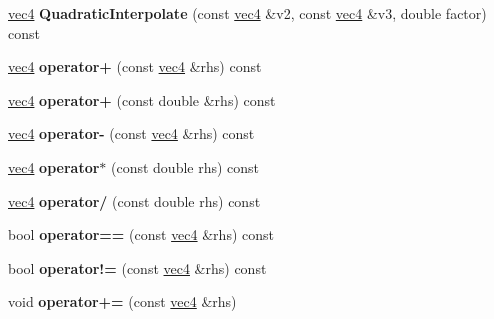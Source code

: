 \begin{DoxyCompactItemize}
\item 
\hypertarget{classmath_1_1vec4_a69a89a5406e39a13db073c647036db3f}{
\hyperlink{classmath_1_1vec4}{vec4} {\bfseries QuadraticInterpolate} (const \hyperlink{classmath_1_1vec4}{vec4} \&v2, const \hyperlink{classmath_1_1vec4}{vec4} \&v3, double factor) const }
\label{classmath_1_1vec4_a69a89a5406e39a13db073c647036db3f}

\item 
\hypertarget{classmath_1_1vec4_a8c33ef79e16b829a103bf0cbc16a8a67}{
\hyperlink{classmath_1_1vec4}{vec4} {\bfseries operator+} (const \hyperlink{classmath_1_1vec4}{vec4} \&rhs) const }
\label{classmath_1_1vec4_a8c33ef79e16b829a103bf0cbc16a8a67}

\item 
\hypertarget{classmath_1_1vec4_a4992011c7bd6023eb044f4d14506e795}{
\hyperlink{classmath_1_1vec4}{vec4} {\bfseries operator+} (const double \&rhs) const }
\label{classmath_1_1vec4_a4992011c7bd6023eb044f4d14506e795}

\item 
\hypertarget{classmath_1_1vec4_accff5e11b577e3e346582ae11344ad8a}{
\hyperlink{classmath_1_1vec4}{vec4} {\bfseries operator-\/} (const \hyperlink{classmath_1_1vec4}{vec4} \&rhs) const }
\label{classmath_1_1vec4_accff5e11b577e3e346582ae11344ad8a}

\item 
\hypertarget{classmath_1_1vec4_a1cc1fcc2e46bdfd97d048f34138e1f18}{
\hyperlink{classmath_1_1vec4}{vec4} {\bfseries operator$\ast$} (const double rhs) const }
\label{classmath_1_1vec4_a1cc1fcc2e46bdfd97d048f34138e1f18}

\item 
\hypertarget{classmath_1_1vec4_abdc3d6bed1d9ec75dbe530d855c125da}{
\hyperlink{classmath_1_1vec4}{vec4} {\bfseries operator/} (const double rhs) const }
\label{classmath_1_1vec4_abdc3d6bed1d9ec75dbe530d855c125da}

\item 
\hypertarget{classmath_1_1vec4_a8af18cd6e3edb99244058e9ae501e7e2}{
bool {\bfseries operator==} (const \hyperlink{classmath_1_1vec4}{vec4} \&rhs) const }
\label{classmath_1_1vec4_a8af18cd6e3edb99244058e9ae501e7e2}

\item 
\hypertarget{classmath_1_1vec4_a6a4dfdb631aa3c8879740d2be4872285}{
bool {\bfseries operator!=} (const \hyperlink{classmath_1_1vec4}{vec4} \&rhs) const }
\label{classmath_1_1vec4_a6a4dfdb631aa3c8879740d2be4872285}

\item 
\hypertarget{classmath_1_1vec4_a9540a2d6ad687fbd4e6bf2b16abbcfa7}{
void {\bfseries operator+=} (const \hyperlink{classmath_1_1vec4}{vec4} \&rhs)}
\label{classmath_1_1vec4_a9540a2d6ad687fbd4e6bf2b16abbcfa7}


\end{DoxyCompactItemize}
